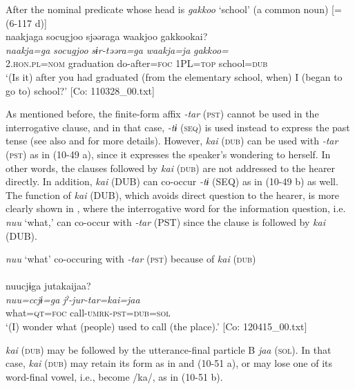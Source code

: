  \ex After the nominal predicate whose head is \textit{gakkoo} ‘school’ (a common noun) [= (6-117 d)]\\
      \glll    naakjaga  {\textbar}socugjoo{\textbar}  sjəəraga  waakjoo  {\textbar}gakkoo{\textbar}kai?\\
    \textit{naakja=ga}  \textit{socugjoo}  \textit{sɨr-təəra=ga}  \textit{waakja=ja}  \textit{gakkoo=}\\
    2.\textsc{hon}.\textsc{pl}=\textsc{nom}  graduation  do-after=\textsc{foc}  1PL=\textsc{top}  school=\textsc{dub}\\
    \glt     ‘(Is it) after you had graduated (from the elementary school, when) I (began to go to) school?’  [Co: 110328\_00.txt]
    \z
\z

As mentioned before, the finite-form affix \textit{{}-tar} (\textsc{pst}) cannot be used in the interrogative clause, and in that case, \textit{{}-tɨ} (\textsc{seq}) is used instead to express the past tense (see also  and  for more details). However, \textit{kai} (\textsc{dub}) can be used with \textit{{}-tar} (\textsc{pst}) as in (10-49 a), since it expresses the speaker’s wondering to herself. In other words, the clauses followed by \textit{kai} (\textsc{dub}) are not addressed to the hearer directly. In addition, \textit{kai} (DUB) can co-occur \textit{{}-tɨ} (SEQ) as in (10-49 b) as well. The function of \textit{kai} (DUB), which avoids direct question to the hearer, is more clearly shown in , where the interrogative word for the information question, i.e. \textit{nuu} ‘what,’ can co-occur with \textit{{}-tar} (PST) since the clause is followed by \textit{kai} (DUB).

\ea\label{ex:10.50}   \textit{nuu} ‘what’ co-occuring with \textit{{}-tar} (\textsc{pst}) because of \textit{kai} (\textsc{dub}) \\\\
      \glll    nuucjɨga  jutakaijaa?\\
    \textit{nuu=ccjɨ=ga}  \textit{jˀ-jur-tar=kai=jaa}\\
    what=\textsc{qt}=\textsc{foc}  call-\textsc{umrk}-\textsc{pst}=\textsc{dub}=\textsc{sol}\\
\glt     ‘(I) wonder what (people) used to call (the place).’  [Co: 120415\_00.txt]
\z

\textit{kai} (\textsc{dub}) may be followed by the utterance-final particle B \textit{jaa} (\textsc{sol}). In that case, \textit{kai} (\textsc{dub}) may retain its form as in  and (10-51 a), or may lose one of its word-final vowel, i.e., become /ka/, as in (10-51 b).

